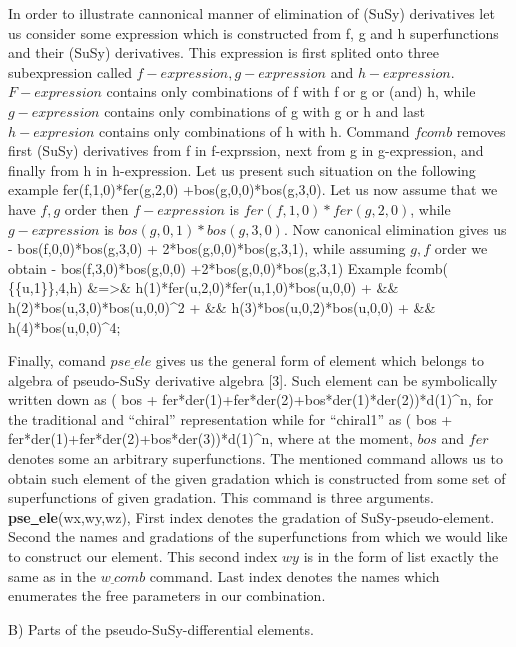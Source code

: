 In order to illustrate cannonical manner of elimination
of (SuSy) derivatives let us consider some expression which is
constructed from  f, g and h superfunctions and their (SuSy) derivatives.
This expression is first splited onto three subexpression called
$f-expression, g-expression $ and $h-expression$.
$F-expression$ contains  only  combinations of f with
f or g or (and) h, while $g-expression$  contains only  combinations
of g with g or h and last $h-expresion$ contains  only  combinations of
h with h. Command $fcomb$ removes first (SuSy) derivatives from f in f-exprssion,
next from g in g-expression, and finally from h in h-expression.
Let us present such situation on the following example
\be
                fer(f,1,0)*fer(g,2,0) +bos(g,0,0)*bos(g,3,0).
\ee
Let us now assume that we have $ f,g $ order then $ f-expression $ is
$ fer(f,1,0)*fer(g,2,0) $, while $g-expression$ is $ bos(g,0,1)*bos(g,3,0) $.
Now canonical elimination gives us
\be
       - bos(f,0,0)*bos(g,3,0) + 2*bos(g,0,0)*bos(g,3,1),
\ee
while assuming $ g,f $ order we obtain
\be
       - bos(f,3,0)*bos(g,0,0) +2*bos(g,0,0)*bos(g,3,1)
\ee
Example
\pe
 fcomb( \{\{u,1\}\},4,h) &=>& h(1)*fer(u,2,0)*fer(u,1,0)*bos(u,0,0) +\cr
           && h(2)*bos(u,3,0)*bos(u,0,0)^2 + \cr
            && h(3)*bos(u,0,2)*bos(u,0,0)  +\cr
                         &&   h(4)*bos(u,0,0)^4;
\ke

Finally, comand $pse\underline{~}ele$ gives us the general form of
element which belongs to algebra of pseudo-SuSy derivative
algebra [3].
Such element can be symbolically written down as
\be
         ( bos + fer*der(1)+fer*der(2)+bos*der(1)*der(2))*d(1)^n,
\ee
for the traditional and ``chiral'' representation while for ``chiral1''
as
\be
        ( bos + fer*der(1)+fer*der(2)+bos*der(3))*d(1)^n,
\ee
where at the moment, $ bos $ and $ fer $ denotes some  an arbitrary
superfunctions.
The mentioned command  allows us to obtain such element
of the given gradation
which is constructed from some set of superfunctions of given
gradation.  This command is three arguments.
\be
        {\bf pse\underline{~}ele}(wx,wy,wz),
\ee
First index denotes the gradation of SuSy-pseudo-element.
Second the names and gradations of the superfunctions from which we would
like to construct  our element. This second index $ wy $ is in the form of list
exactly the same as in the $ w\underline{~}comb $ command.
Last index denotes
the names which enumerates the free parameters in our combination.
\vspace{0.9cm}

B) Parts of the pseudo-SuSy-differential elements.

